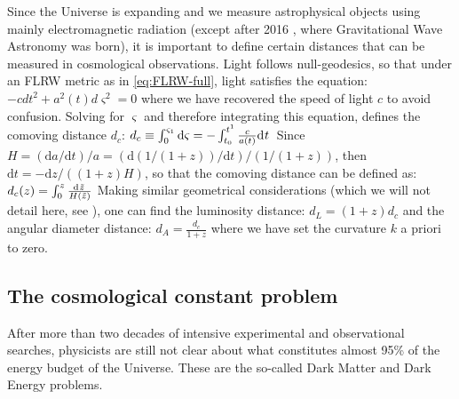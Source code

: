 Since the Universe is expanding and we measure astrophysical objects using mainly electromagnetic radiation (except after 2016 \cite{cite LIGO}, 
where Gravitational Wave Astronomy was born), it is important to define certain distances that can be measured in cosmological observations.
Light follows null-geodesics, so that under an FLRW metric as in \cref{eq:FLRW-full}, 
light satisfies the equation:
\beeqc$
- c dt^2 + a^2 (t) d\varsigma^2 = 0 
$
where we have recovered the speed of light $c$ to avoid confusion.
Solving for $\varsigma$ and therefore integrating this equation, defines the comoving distance $d_c$:
\beeqp$
d_c \equiv \int_0^{\varsigma_1} \mathrm{d}\varsigma = - \int_{t_0}^{t^1} \frac{c}{a(t)} \mathrm{d}^{} {t} \, 
$
Since $H = (\mathrm{d}a/\mathrm{d}t)/a = (\mathrm{d}(1/(1+z))/\mathrm{d}t)/(1/(1+z)) $, then $\mathrm{d} t = -\mathrm{d}z / ((1+z) H) $,
so that the comoving distance can be defined as:
\beeqp$
d_c (z) = \int_{0}^{z} \frac{\mathrm{d}^{} {\tilde z} \,}{H(\tilde z)}
$
Making similar geometrical considerations (which we will not detail here, see \cite{amendola_dark_2010}), one can find the
luminosity distance:
\beeqc$
d_L = (1+z) d_c
$
and the angular diameter distance:
\beeqc$
d_A = \frac{d_c}{1+z}
$
where we have set the curvature $k$ a priori to zero.


\subsection{The cosmological constant problem \label{sub:CC-problem}}

After more than two decades of intensive experimental and observational searches,
physicists are still not clear about what constitutes almost 95\% of the energy budget of
the Universe. These are the so-called Dark Matter and Dark Energy problems.

